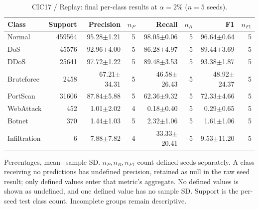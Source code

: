 \begin{table}[t]
\centering\scriptsize
\setlength{\tabcolsep}{3.3pt}
\caption{CIC17 / Replay: final per-class results at $\alpha=2\%$ ($n=5$ seeds).}\label{tab:forgetting-class-cic_ids_2017-replay}
\begin{tabular}{lrrrrrrr}
\toprule
Class & Support & Precision & $n_P$ & Recall & $n_R$ & F1 & $n_{F1}$ \\
\midrule
Normal & 459564 & 95.28$\pm$1.21 & 5 & 98.05$\pm$0.06 & 5 & 96.64$\pm$0.64 & 5 \\
DoS & 45576 & 92.96$\pm$4.00 & 5 & 86.28$\pm$4.97 & 5 & 89.44$\pm$3.69 & 5 \\
DDoS & 25641 & 97.72$\pm$1.22 & 5 & 89.48$\pm$3.53 & 5 & 93.38$\pm$1.87 & 5 \\
Bruteforce & 2458 & 67.21$\pm$34.31 & 5 & 46.58$\pm$26.43 & 5 & 48.92$\pm$24.37 & 5 \\
PortScan & 31606 & 87.84$\pm$5.88 & 5 & 62.36$\pm$9.32 & 5 & 72.33$\pm$4.66 & 5 \\
WebAttack & 452 & 1.01$\pm$2.02 & 4 & 0.18$\pm$0.40 & 5 & 0.29$\pm$0.65 & 5 \\
Botnet & 370 & 1.44$\pm$1.03 & 5 & 2.32$\pm$1.06 & 5 & 1.61$\pm$1.06 & 5 \\
Infiltration & 6 & 7.88$\pm$7.82 & 4 & 33.33$\pm$20.41 & 5 & 9.53$\pm$11.20 & 5 \\
\bottomrule
\end{tabular}
\par\smallskip\begin{minipage}{0.98\textwidth}\scriptsize Percentages, mean$\pm$sample SD. $n_P,n_R,n_{F1}$ count defined seeds separately. A class receiving no predictions has undefined precision, retained as null in the raw seed result; only defined values enter that metric's aggregate. No defined values is shown as undefined, and one defined value has no sample SD. Support is the per-seed test class count. Incomplete groups remain descriptive.\end{minipage}
\end{table}

